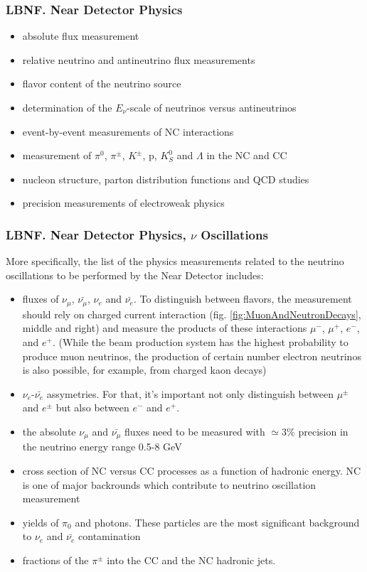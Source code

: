 \begin{frame}\frametitle{LBNF. Near Detector Physics}
\scriptsize
\begin{itemize}
  \item absolute flux measurement
  \item relative neutrino and antineutrino flux measurements
  \item flavor content of the neutrino source
  \item determination of the $E_\nu$-scale of neutrinos versus antineutrinos
  \item event-by-event measurements of NC interactions
  \item measurement of $\pi^0$, $\pi^\pm$, $K^\pm$, p, $K^0_S$ and $\Lambda$ in the NC and CC
  \item nucleon structure, parton distribution functions and QCD studies
  \item precision measurements of electroweak physics
\end{itemize}
\end{frame}

\begin{frame}\frametitle{LBNF. Near Detector Physics, $\nu$ Oscillations}
\scriptsize
More specifically, the list of the physics measurements related to the neutrino oscillations to be performed by the Near Detector includes:
\begin{itemize}
  \item fluxes of $\nu_\mu$, $\bar{\nu_\mu}$, $\nu_e$ and $\bar{\nu_e}$. To distinguish between flavors, the measurement should rely on charged current interaction (fig. \ref{fig:MuonAndNeutronDecays}, middle and right) and measure the products of these interactions $\mu^-$, $\mu^+$, $e^-$, and $e^+$. (While the beam production system has the highest probability to produce muon neutrinos, the production of certain number electron neutrinos is also possible, for example, from charged kaon decays)
  \item $\nu_e$-$\bar{\nu_e}$ assymetries. For that, it's important not only distinguish between $\mu^\pm$ and $e^\pm$ but also between $e^-$ and $e^+$.
  \item the absolute $\nu_\mu$ and $\bar{\nu_\mu}$ fluxes need to be measured with $\simeq{3\%}$ precision in the neutrino energy range 0.5-8 GeV
  \item cross section of NC versus CC processes as a function of hadronic energy. NC is one of major backrounds which contribute to neutrino oscillation measurement
  \item yields of $\pi_0$ and photons. These particles are the most significant background to $\nu_e$ and $\bar{\nu_e}$ contamination
  \item fractions of the $\pi^\pm$ into the CC and the NC hadronic jets.    
\end{itemize} 
\end{frame}

